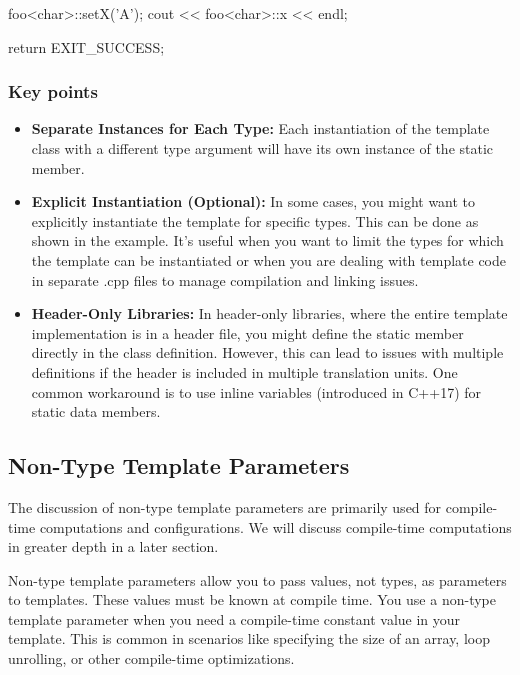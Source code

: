 \documentclass{report}
\begin{document}
\begin{concept}
\begin{cppcode}
{        foo<char>::setX('A');
        cout << foo<char>::x << endl;

        return EXIT_SUCCESS;
    }
    \end{cppcode}

    \pagebreak 
    \subsubsection{Key points}
    \begin{itemize}
        \item \textbf{Separate Instances for Each Type:} Each instantiation of the template class with a different type argument will have its own instance of the static member. 
        \item \textbf{Explicit Instantiation (Optional):} In some cases, you might want to explicitly instantiate the template for specific types. This can be done as shown in the example. It's useful when you want to limit the types for which the template can be instantiated or when you are dealing with template code in separate .cpp files to manage compilation and linking issues.
        \item \textbf{Header-Only Libraries:} In header-only libraries, where the entire template implementation is in a header file, you might define the static member directly in the class definition. However, this can lead to issues with multiple definitions if the header is included in multiple translation units. One common workaround is to use inline variables (introduced in C++17) for static data members.
    \end{itemize}

    \bigbreak \noindent 
    \subsection{Non-Type Template Parameters}
    \bigbreak \noindent 
    \begin{remark}
        The discussion of non-type template parameters are primarily used for compile-time computations and configurations. We will discuss compile-time computations in greater depth in a later section.
    \end{remark}
    
    \bigbreak \noindent 
    \begin{concept}
        Non-type template parameters allow you to pass values, not types, as parameters to templates. These values must be known at compile time.
        \bigbreak \noindent 
        You use a non-type template parameter when you need a compile-time constant value in your template. This is common in scenarios like specifying the size of an array, loop unrolling, or other compile-time optimizations.
    \end{concept}


\end{concept}
\end{document}
